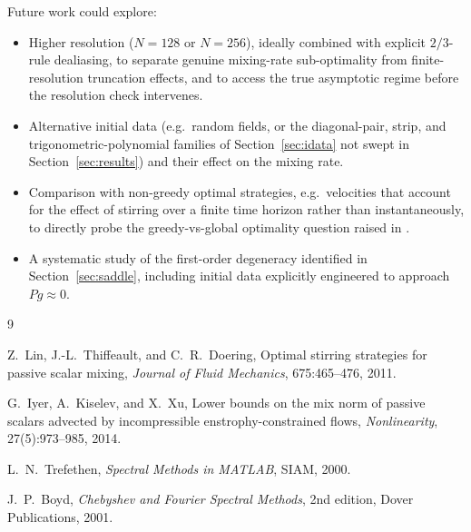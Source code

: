 \documentclass[12pt,a4paper]{article}
\newcommand{\Proj}{P}
\theoremstyle{definition}
\theoremstyle{plain}
\begin{document}
Future work could explore:
\begin{itemize}
  \item Higher resolution ($N=128$ or $N=256$), ideally combined with
        explicit $2/3$-rule dealiasing, to separate genuine mixing-rate
        sub-optimality from finite-resolution truncation effects, and to
        access the true asymptotic regime before the resolution check
        intervenes.
  \item Alternative initial data (e.g.\ random fields, or the
        diagonal-pair, strip, and trigonometric-polynomial families of
        Section~\ref{sec:idata} not swept in Section~\ref{sec:results})
        and their effect on the mixing rate.
  \item Comparison with non-greedy optimal strategies, e.g.\ velocities
        that account for the effect of stirring over a finite time horizon
        rather than instantaneously, to directly probe the greedy-vs-global
        optimality question raised in \cite{LTD2011}.
  \item A systematic study of the first-order degeneracy identified in
        Section~\ref{sec:saddle}, including initial data explicitly
        engineered to approach $\Proj g \approx 0$.
\end{itemize}


\begin{thebibliography}{9}

Z.~Lin, J.-L.~Thiffeault, and C.~R.~Doering,
\newblock Optimal stirring strategies for passive scalar mixing,
\newblock \emph{Journal of Fluid Mechanics}, 675:465--476, 2011.

G.~Iyer, A.~Kiselev, and X.~Xu,
\newblock Lower bounds on the mix norm of passive scalars advected by
  incompressible enstrophy-constrained flows,
\newblock \emph{Nonlinearity}, 27(5):973--985, 2014.

L.~N.~Trefethen,
\newblock \emph{Spectral Methods in MATLAB},
\newblock SIAM, 2000.

J.~P.~Boyd,
\newblock \emph{Chebyshev and Fourier Spectral Methods},
\newblock 2nd edition, Dover Publications, 2001.

\end{thebibliography}
\end{document}
